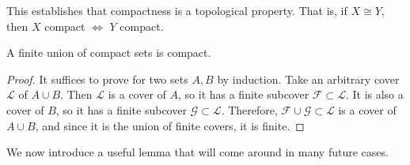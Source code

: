   This establishes that compactness is a topological property. That is, if $X \cong Y$, then $X$ compact $\iff$ $Y$ compact. 
  
  \begin{lemma}
    \label{thm:finite-unions-of-compact-sets}
    A finite union of compact sets is compact. 
  \end{lemma}
  \begin{proof}
    It suffices to prove for two sets $A, B$ by induction. Take an arbitrary cover $\mathscr{L}$ of $A \cup B$. Then $\mathscr{L}$ is a cover of $A$, so it has a finite subcover $\mathscr{F} \subset \mathscr{L}$. It is also a cover of $B$, so it has a finite subcover $\mathscr{G} \subset \mathscr{L}$. Therefore, $\mathscr{F} \cup \mathscr{G} \subset \mathscr{L}$ is a cover of $A \cup B$, and since it is the union of finite covers, it is finite. 
  \end{proof}

  We now introduce a useful lemma that will come around in many future cases. 

